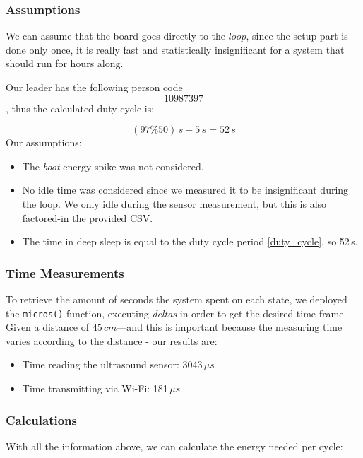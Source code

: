 \documentclass{article}
\begin{document}
\subsubsection{Assumptions}
We can assume that the board goes directly to the $loop$, since the setup part is done only once, it is really fast and statistically insignificant for a system that should run for hours along.


\vspace{4mm}
\noindent Our leader has the following person code $$10987397$$, thus the calculated duty cycle is:

\begin{equation} \label{duty_cycle}
     (97\%50)\,s + 5\,s = 52\,s
\end{equation}
\newpage
Our assumptions:
\begin{itemize}
    \item The \textit{boot} energy spike was not considered.
    \item No idle time was considered since we measured it to be insignificant during the loop. We only idle during the sensor measurement, but this is also factored-in the provided CSV.
    \item The time in deep sleep is equal to the duty cycle period \ref{duty_cycle}, so 52\,s.
\end{itemize}

\subsubsection{Time Measurements}

To retrieve the amount of seconds the system spent on each state, we deployed the \texttt{micros()} function, executing \textit{deltas} in order to get the desired time frame.
Given a distance of $45\,cm$---and this is important because the measuring time varies according to the distance - our results are:
\begin{itemize}
    \item Time reading the ultrasound sensor: 3043\,$\mu s$
    \item Time transmitting via Wi-Fi: 181\,$\mu s$
\end{itemize}

\subsubsection{Calculations}

With all the information above, we can calculate the energy needed per cycle:
\end{document}

